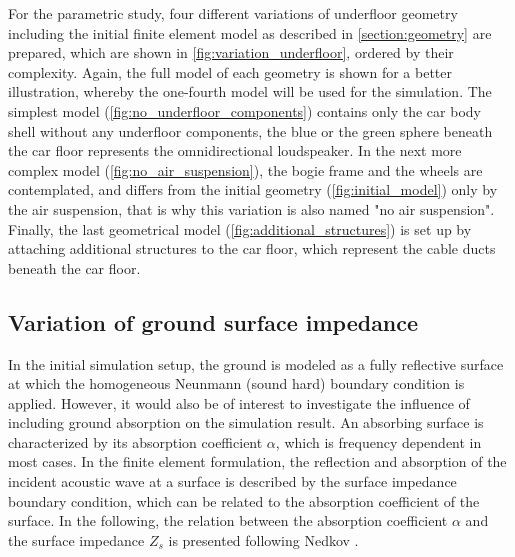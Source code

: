 For the parametric study, four different variations of underfloor geometry including the initial finite element model as described in \cref{section:geometry} are prepared, which are shown in \cref{fig:variation_underfloor}, ordered by their complexity. Again, the full model of each geometry is shown for a better illustration, whereby the one-fourth model will be used for the simulation. The simplest model (\cref{fig:no_underfloor_components}) contains only the car body shell without any underfloor components, the blue or the green sphere beneath the car floor represents the omnidirectional loudspeaker. In the next more complex model (\cref{fig:no_air_suspension}), the bogie frame and the wheels are contemplated, and differs from the initial geometry (\cref{fig:initial_model}) only by the air suspension, that is why this variation is also named "no air suspension". Finally, the last geometrical model (\cref{fig:additional_structures}) is set up by attaching additional structures to the car floor, which represent the cable ducts beneath the car floor.

\newpage
\subsection{Variation of ground surface impedance}

In the initial simulation setup, the ground is modeled as a fully reflective surface at which the homogeneous Neunmann (sound hard) boundary condition is applied.
However, it would also be of interest to investigate the influence of including ground absorption on the simulation result.
An absorbing surface is characterized by its absorption coefficient $\alpha$, which is frequency dependent in most cases.
In the finite element formulation, the reflection and absorption of the incident acoustic wave at a surface is described by the surface impedance boundary condition, which can be related to the absorption coefficient of the surface. In the following, the relation between the absorption coefficient $\alpha$ and the surface impedance $Z_s$ is presented following Nedkov \cite{nedkov_impedance_2011}.

